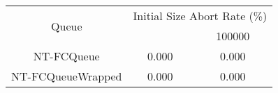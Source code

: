 \begin{tabular}{|c|c|c|}
\hline
\multirow{2}{*}{Queue} & \multicolumn{2}{c|}{Initial Size Abort Rate (\%)}\\\cline{2-3}& \qquad 10000 \qquad\quad & 100000\\
\hline
\hline
NT-FCQueue & 0.000 & 0.000\\
NT-FCQueueWrapped & 0.000 & 0.000\\
\hline\end{tabular}
